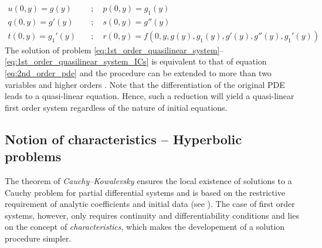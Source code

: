 \begin{equation}
  \label{eq:1st_order_quasilinear_system_ICs}
  \begin{aligned}
    u(0,y) = g(y) \quad & ; \quad     p(0,y) = g_1(y) \\
    q(0,y) = g'(y) \quad & ; \quad    s(0,y) = g''(y) \\
    t(0,y) = g_1'(y) \quad & ; \quad    r(0,y) = f(0,y,g(y),g_1(y),g'(y),g''(y),g_1'(y))
  \end{aligned}
\end{equation}
The solution of problem \eqref{eq:1st_order_quasilinear_system}--\eqref{eq:1st_order_quasilinear_system_ICs}  is equivalent to that of equation \eqref{eq:2nd_order_pde} and the procedure can be extended to more than two variables and higher orders \cite[Chapter~2]{PDEs}. Note that the differentiation of the original PDE leads to a quasi-linear equation. Hence, such a reduction will yield a quasi-linear first order system regardless of the nature of initial equations.

\subsection{Notion of characteristics -- Hyperbolic problems}
The theorem of \textit{Cauchy--Kowalevsky} ensures the local existence of solutions to a Cauchy problem for partial differential systems and is based on the restrictive requirement of analytic coefficients and initial data (see \cite[Chapter~2]{PDEs}). The case of first order systems, however, only requires continuity and differentiability conditions and lies on the concept of \textit{characteristics}, which makes the developement of a solution procedure simpler.

